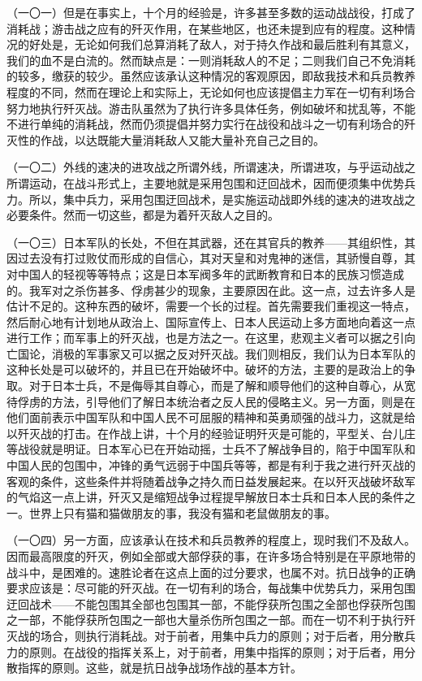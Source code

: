 （一〇一）但是在事实上，十个月的经验是，许多甚至多数的运动战战役，打成了消耗战；游击战之应有的歼灭作用，在某些地区，也还未提到应有的程度。这种情况的好处是，无论如何我们总算消耗了敌人，对于持久作战和最后胜利有其意义，我们的血不是白流的。然而缺点是：一则消耗敌人的不足；二则我们自己不免消耗的较多，缴获的较少。虽然应该承认这种情况的客观原因，即敌我技术和兵员教养程度的不同，然而在理论上和实际上，无论如何也应该提倡主力军在一切有利场合努力地执行歼灭战。游击队虽然为了执行许多具体任务，例如破坏和扰乱等，不能不进行单纯的消耗战，然而仍须提倡并努力实行在战役和战斗之一切有利场合的歼灭性的作战，以达既能大量消耗敌人又能大量补充自己之目的。

（一〇二）外线的速决的进攻战之所谓外线，所谓速决，所谓进攻，与乎运动战之所谓运动，在战斗形式上，主要地就是采用包围和迂回战术，因而便须集中优势兵力。所以，集中兵力，采用包围迂回战术，是实施运动战即外线的速决的进攻战之必要条件。然而一切这些，都是为着歼灭敌人之目的。

（一〇三）日本军队的长处，不但在其武器，还在其官兵的教养——其组织性，其因过去没有打过败仗而形成的自信心，其对天皇和对鬼神的迷信，其骄慢自尊，其对中国人的轻视等等特点；这是日本军阀多年的武断教育和日本的民族习惯造成的。我军对之杀伤甚多、俘虏甚少的现象，主要原因在此。这一点，过去许多人是估计不足的。这种东西的破坏，需要一个长的过程。首先需要我们重视这一特点，然后耐心地有计划地从政治上、国际宣传上、日本人民运动上多方面地向着这一点进行工作；而军事上的歼灭战，也是方法之一。在这里，悲观主义者可以据之引向亡国论，消极的军事家又可以据之反对歼灭战。我们则相反，我们认为日本军队的这种长处是可以破坏的，并且已在开始破坏中。破坏的方法，主要的是政治上的争取。对于日本士兵，不是侮辱其自尊心，而是了解和顺导他们的这种自尊心，从宽待俘虏的方法，引导他们了解日本统治者之反人民的侵略主义。另一方面，则是在他们面前表示中国军队和中国人民不可屈服的精神和英勇顽强的战斗力，这就是给以歼灭战的打击。在作战上讲，十个月的经验证明歼灭是可能的，平型关、台儿庄等战役就是明证。日本军心已在开始动摇，士兵不了解战争目的，陷于中国军队和中国人民的包围中，冲锋的勇气远弱于中国兵等等，都是有利于我之进行歼灭战的客观的条件，这些条件并将随着战争之持久而日益发展起来。在以歼灭战破坏敌军的气焰这一点上讲，歼灭又是缩短战争过程提早解放日本士兵和日本人民的条件之一。世界上只有猫和猫做朋友的事，我没有猫和老鼠做朋友的事。

（一〇四）另一方面，应该承认在技术和兵员教养的程度上，现时我们不及敌人。因而最高限度的歼灭，例如全部或大部俘获的事，在许多场合特别是在平原地带的战斗中，是困难的。速胜论者在这点上面的过分要求，也属不对。抗日战争的正确要求应该是：尽可能的歼灭战。在一切有利的场合，每战集中优势兵力，采用包围迂回战术——不能包围其全部也包围其一部，不能俘获所包围之全部也俘获所包围之一部，不能俘获所包围之一部也大量杀伤所包围之一部。而在一切不利于执行歼灭战的场合，则执行消耗战。对于前者，用集中兵力的原则；对于后者，用分散兵力的原则。在战役的指挥关系上，对于前者，用集中指挥的原则；对于后者，用分散指挥的原则。这些，就是抗日战争战场作战的基本方针。

